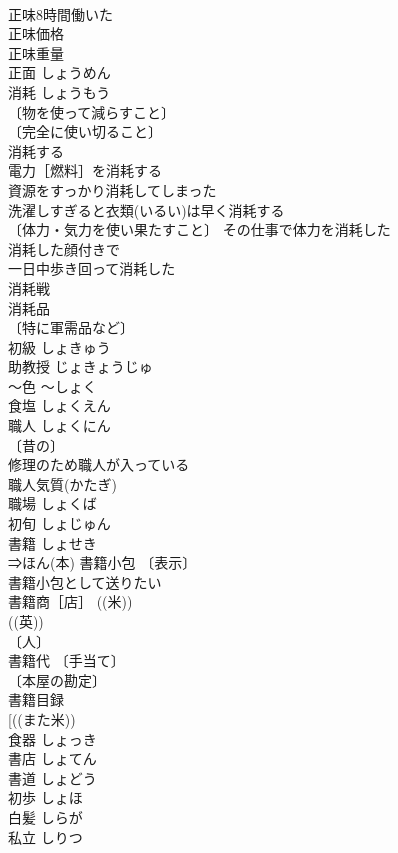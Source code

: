 \documentclass[8pt]{extreport}
\begin{document}
\begin{CJK}{UTF8}{min}
\\	正味8時間働いた 
\\	正味価格 
\\	正味重量 
\\	正面	しょうめん	
\\	消耗	しょうもう	
\\	〔物を使って減らすこと〕
\\	〔完全に使い切ること〕
\\	消耗する 
\\	電力［燃料］を消耗する 
\\	資源をすっかり消耗してしまった 
\\	洗濯しすぎると衣類(いるい)は早く消耗する 
\\	〔体力・気力を使い果たすこと〕 その仕事で体力を消耗した 
\\	消耗した顔付きで 
\\	一日中歩き回って消耗した 
\\	消耗戦 
\\	消耗品 
\\	〔特に軍需品など〕
\\	初級	しょきゅう	
\\	助教授	じょきょうじゅ	
\\	～色	～しょく	
\\	食塩	しょくえん	
\\	職人	しょくにん	
\\	〔昔の〕
\\	修理のため職人が入っている 
\\	職人気質(かたぎ) 
\\	職場	しょくば	
\\	初旬	しょじゅん	
\\	書籍	しょせき	
\\	⇒ほん(本) 書籍小包 〔表示〕
\\	書籍小包として送りたい 
\\	書籍商［店］ ((米)) 
\\	((英)) 
\\	〔人〕
\\	書籍代 〔手当て〕
\\	〔本屋の勘定〕
\\	書籍目録 
\\	[((また米)) 
\\	食器	しょっき	
\\	書店	しょてん	
\\	書道	しょどう	
\\	初歩	しょほ	
\\	白髪	しらが	
\\	私立	しりつ	

\end{CJK}
\end{document}
